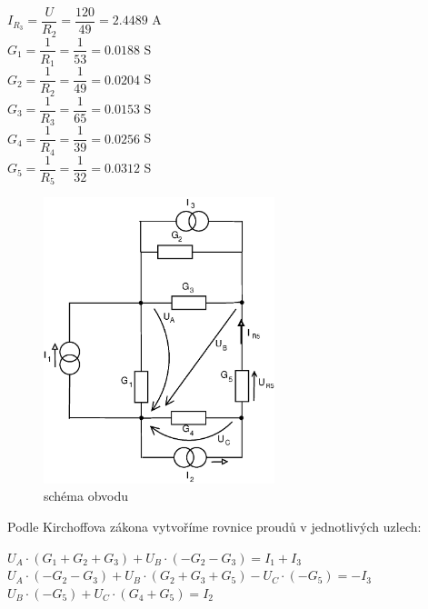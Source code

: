 \documentclass[10pt,a4paper]{article}
\begin{document}
\begin{center}
   \begin{large}
   $ I_{R_3} = \dfrac{U}{R_2} = \dfrac{120}{49} = 2.4489 $ A
   \\[6pt]
   $ G_1 = \dfrac{1}{R_1} = \dfrac{1}{53} = 0.0188 $ S
   \\[6pt]
   $ G_2 = \dfrac{1}{R_2} = \dfrac{1}{49} = 0.0204 $ S
   \\[6pt]
   $ G_3 = \dfrac{1}{R_3} = \dfrac{1}{65} = 0.0153 $ S
   \\[6pt]
   $ G_4 = \dfrac{1}{R_4} = \dfrac{1}{39} = 0.0256 $ S
   \\[6pt]
   $ G_5 = \dfrac{1}{R_5} = \dfrac{1}{32} = 0.0312 $ S
   \end{large}
  \end{center}  
  \newpage
  
   \begin{figure}[t]
    \begin{center}
     \includegraphics[width=0.6\textwidth]{2026.eps}
     \caption{schéma obvodu}
    \end{center}
   \end{figure}   

   \begin{large}
    \begin{flushleft}
     Podle Kirchoffova zákona vytvoříme rovnice proudů v jednotlivých uzlech:
    \end{flushleft}
    \end{large}
   
   \begin{center}
   \begin{large}
     $ U_A \cdot (G_1 +G_2 +G_3) + U_B \cdot (-G_2 -G_3) = I_1 + I_3 $
     \\[6pt]
     $ U_A \cdot (-G_2 -G_3) + U_B \cdot (G_2 +G_3 +G_5) - U_C \cdot(-G_5) =-I_3 $   
    \\[6pt]
     $ U_B \cdot (-G_5) + U_C \cdot (G_4 + G_5) = I_2 $
     \\[40pt]
   \end{large}
  \end{center}    
  
\end{document}
